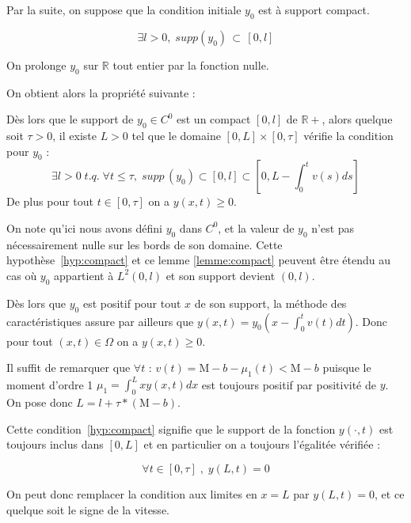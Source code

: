 \documentclass[a4paper]{article}
\newcommand{\mass}{\mathrm{M}}
\newcommand{\dep}{b}
\begin{document}
Par la suite, on suppose que la condition initiale $y_0$ est à support compact.

\begin{equation}
	\label{hyp:compact}
	\exists l>0, \; supp(y_0) \, \subset \, [0,l]
\end{equation}

On prolonge $y_0$ sur $\mathbb{R}$ tout entier par la fonction nulle.

On obtient alors la propriété suivante :

\begin{lemme}
	\label{lemme:compact}
	Dès lors que le support de $y_0 \in C^0$ est un compact $[0,l]$ de $\mathbb{R+}$,
	alors quelque soit $\tau >0$, il existe $L>0$ tel que le domaine $[0,L]\times [0,\tau]$
	vérifie la condition pour $y_0$ :
	\[\exists l>0 \; t.q. \; \forall t \leq \tau, \; supp \, (y_0) \subset [0,l]\subset [0,L-\int_{0}^t v(s)ds] \]
	De plus pour tout $t\in[0,\tau]$ on a $y(x,t) \geq 0 $.
\end{lemme}

\begin{remarque}
	On note qu'ici nous avons défini $y_0$ dans $C^0$, et la valeur de $y_0$ n'est pas nécessairement nulle sur les bords de son domaine.
	Cette hypothèse~\eqref{hyp:compact} et ce lemme \ref{lemme:compact} peuvent être étendu au cas où $y_0$ appartient à $L^2(0,l)$ et son support devient $(0,l)$.
\end{remarque}

\begin{preuve}
	Dès lors que $y_0$ est positif pour tout $x$ de son support, 
	la méthode des caractéristiques assure par ailleurs que $y(x,t) = y_0(x - \int_0^t v(t)dt)$.
	Donc pour tout $(x,t) \in \Omega$ on a $y(x,t)\geq 0$.
	
	Il suffit de remarquer que $\forall t$ :
	$v(t) = \mass - \dep - \mu_1 (t) < \mass - \dep $
	puisque le moment d'ordre 1 $\mu_1 = \int_0^L x y(x,t)dx$ est toujours positif par positivité de $y$.
	On pose donc $L = l + \tau*(\mass-\dep)$.
\end{preuve}

Cette condition~\eqref{hyp:compact} signifie que le support de la fonction $y( \cdot,t)$ est toujours inclus dans $[0,L]$ et en particulier on a toujours l'égalitée vérifiée : 

\[ \forall t \in [0,\tau] \;, \; y(L,t) =0\]

On peut donc remplacer la condition aux limites en $x=L$ par $y(L,t)=0$, et ce quelque soit le signe de la vitesse.
\end{document}
